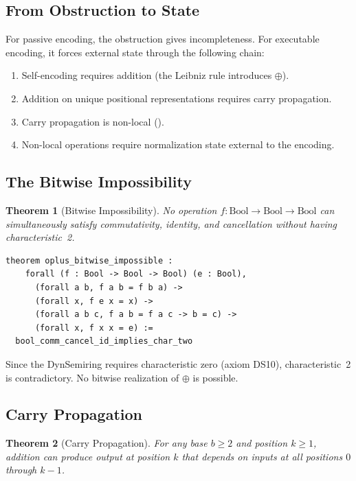 \documentclass[11pt,a4paper]{article}
\newtheorem{theorem}{Theorem}[section]
\theoremstyle{definition}
\theoremstyle{remark}
\newcommand{\opl}{\oplus}
\begin{document}
\subsection{From Obstruction to State}

For passive encoding, the obstruction gives incompleteness. For executable
encoding, it forces external state through the following chain:
\begin{enumerate}
  \item Self-encoding requires addition (the Leibniz rule introduces $\opl$).
  \item Addition on unique positional representations requires carry
    propagation.
  \item Carry propagation is non-local ().
  \item Non-local operations require normalization state external to the
    encoding.
\end{enumerate}

\subsection{The Bitwise Impossibility}

\begin{theorem}[Bitwise Impossibility]
\label{thm:bitwise}
No operation $f : \mathrm{Bool} \to \mathrm{Bool} \to \mathrm{Bool}$ can
simultaneously satisfy commutativity, identity, and cancellation without
having characteristic~2.
\end{theorem}

\begin{lstlisting}[caption={Bitwise impossibility (Obstruction/Oplus.lean)}]
theorem oplus_bitwise_impossible :
    forall (f : Bool -> Bool -> Bool) (e : Bool),
      (forall a b, f a b = f b a) ->
      (forall x, f e x = x) ->
      (forall a b c, f a b = f a c -> b = c) ->
      (forall x, f x x = e) :=
  bool_comm_cancel_id_implies_char_two
\end{lstlisting}

Since the DynSemiring requires characteristic zero (axiom DS10),
characteristic~2 is contradictory. No bitwise realization of $\opl$ is
possible.

\subsection{Carry Propagation}

\begin{theorem}[Carry Propagation]
\label{thm:carry}
For any base $b \geq 2$ and position $k \geq 1$, addition can produce
output at position $k$ that depends on inputs at all positions $0$ through
$k-1$.
\end{theorem}
\end{document}
